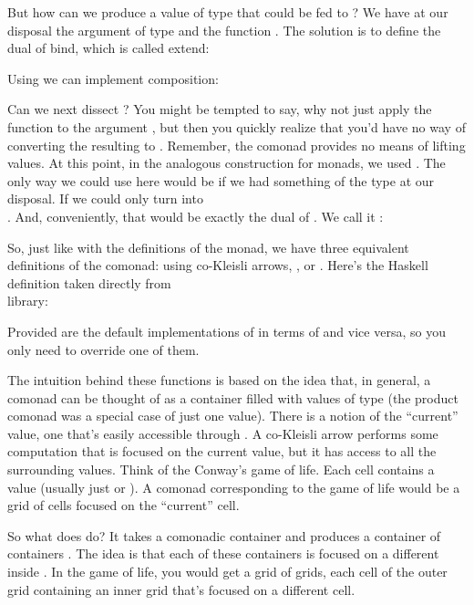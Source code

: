 But how can we produce a value of type  that could be fed
to ? We have at our disposal the argument of type
 and the function .
The solution is to define the dual of bind, which is called extend:

Using  we can implement composition:

Can we next dissect ? You might be tempted to say, why
not just apply the function  to the
argument , but then you quickly realize that you'd have no
way of converting the resulting  to . Remember,
the comonad provides no means of lifting values. At this point, in the
analogous construction for monads, we used . The only way
we could use  here would be if we had something of the type
 at our disposal. If we could only turn 
into\\ . And, conveniently, that would be exactly the
dual of . We call it :

So, just like with the definitions of the monad, we have three
equivalent definitions of the comonad: using co-Kleisli arrows,
, or . Here's the Haskell definition
taken directly from\\  library:

Provided are the default implementations of  in terms of
 and vice versa, so you only need to override one of
them.

The intuition behind these functions is based on the idea that, in
general, a comonad can be thought of as a container filled with values
of type  (the product comonad was a special case of just one
value). There is a notion of the ``current'' value, one that's easily
accessible through . A co-Kleisli arrow performs some
computation that is focused on the current value, but it has access to
all the surrounding values. Think of the Conway's game of life. Each
cell contains a value (usually just  or ). A
comonad corresponding to the game of life would be a grid of cells
focused on the ``current'' cell.

So what does  do? It takes a comonadic container
 and produces a container of containers .
The idea is that each of these containers is focused on a different
 inside . In the game of life, you would get a
grid of grids, each cell of the outer grid containing an inner grid
that's focused on a different cell.

